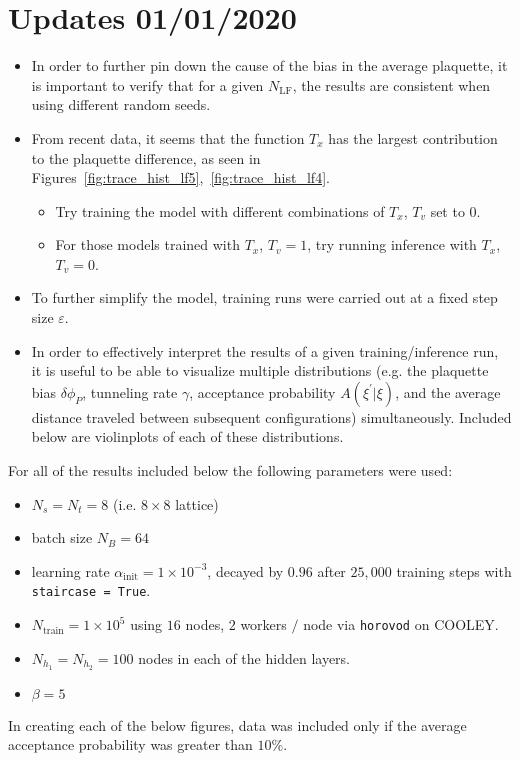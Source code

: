 \section{Updates 01/01/2020}%
\label{sec:updates_2020_01_01}
\begin{itemize}
  \item In order to further pin down the cause of the bias in the average
    plaquette, it is important to verify that for a given $N_{\mathrm{LF}}$,
    the results are consistent when using different random seeds.  %
  \item From recent data, it seems that the function $T_{x}$ has the largest
    contribution to the plaquette difference, as seen in
    Figures~\ref{fig:trace_hist_lf5},~\ref{fig:trace_hist_lf4}.
    \begin{itemize}
      \item Try training the model with different combinations of $T_{x}$,
        $T_{v}$ set to $0$.
      \item For those models trained with $T_{x}$, $T_{v} = 1$, try running
        inference with $T_{x}$, $T_{v} = 0$.
    \end{itemize}
  \item To further simplify the model, training runs were carried out at a
    fixed step size $\varepsilon$.
  \item In order to effectively interpret the results of a given
    training/inference run, it is useful to be able to visualize multiple
    distributions (e.g. the plaquette bias $\delta \phi_{P}$, tunneling rate
    $\gamma$, acceptance probability $A(\xi^{\prime}|\xi)$, and the average
    distance traveled between subsequent configurations) simultaneously.
    Included below are violinplots of each of these distributions.
\end{itemize}
%
For all of the results included below the following parameters were used:
\begin{itemize}
  \item $N_{s} = N_{t} = 8$ (i.e. $8\times8$ lattice)
  \item batch size $N_{B} = 64$
  \item learning rate $\alpha_{\mathrm{init}} = 1\times10^{-3}$, decayed by $0.96$ after
    $25,000$ training steps with \texttt{staircase = True}.
  \item $N_{\mathrm{train}} = 1\times10^{5}$ using $16$ nodes, $2$ workers $/$
    node via \texttt{horovod} on COOLEY\@.
  \item $N_{h_1} = N_{h_2} = 100$ nodes in each of the hidden layers.
  \item $\beta = 5$
\end{itemize}
%
In creating each of the below figures, data was included only if the average
acceptance probability was greater than $10\%$.

